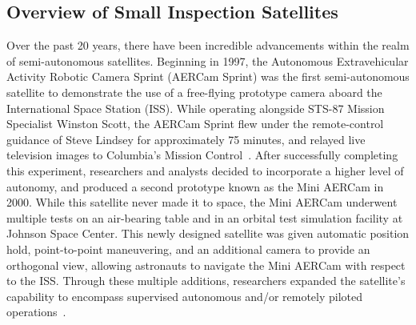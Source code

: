 \documentclass[journal, 10pt]{IEEEtran}
\begin{document}
\subsection{Overview of Small Inspection Satellites}
Over the past 20 years, there have been incredible advancements within the realm of semi-autonomous satellites. Beginning in 1997, the Autonomous Extravehicular Activity Robotic Camera Sprint (AERCam Sprint) was the first semi-autonomous satellite to demonstrate the use of a free-flying prototype camera aboard the International Space Station (ISS). While operating alongside STS-87 Mission Specialist Winston Scott, the AERCam Sprint flew under the remote-control guidance of Steve Lindsey for approximately 75 minutes, and relayed live television images to Columbia's Mission Control~\cite{Aercam, MiniAercam}. After successfully completing this experiment, researchers and analysts decided to incorporate a higher level of autonomy, and produced a second prototype known as the Mini AERCam in 2000. While this satellite never made it to space, the Mini AERCam underwent multiple tests on an air-bearing table and in an orbital test simulation facility at Johnson Space Center. This newly designed satellite was given automatic position hold, point-to-point maneuvering, and an additional camera to provide an orthogonal view, allowing astronauts to navigate the Mini AERCam with respect to the ISS. Through these multiple additions, researchers expanded the satellite's capability to encompass supervised autonomous and/or remotely piloted operations~\cite{MiniAercam, MiniAercam2}.
\end{document}
